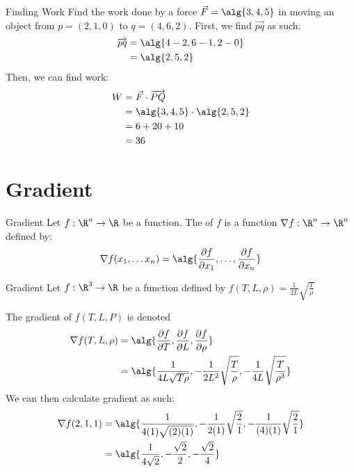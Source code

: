 \documentclass[12pt]{report}
\begin{document}
\begin{exbox}{Finding Work}{}
    Find the work done by a force $\vec{F} = \alg{3,4,5}$ in moving an object from $p = (2,1,0)$ to $q = (4,6,2)$.
    \tcblower
    First, we find $\overrightarrow{pq}$ as such:
    \begin{align*}
        \overrightarrow{pq}
        &= \alg{4-2, 6-1, 2-0} \\
        &= \alg{2,5,2}
    \end{align*}
    Then, we can find work:
    \begin{align*}
        W
        &= \vec{F} \cdot \overrightarrow{PQ} \\
        &= \alg{3,4,5} \cdot \alg{2,5,2} \\
        &= 6 + 20 + 10 \\
        &= 36
    \end{align*}
\end{exbox}

\section{Gradient}

\begin{dfnbox}{Gradient}{}
    Let $f : \R^n \to \R$ be a function. The  of $f$ is a function $\nabla f : \R^n \to \R^n$ defined by:
    \[ \nabla f(x_1, \ldots x_n) = \alg{ \frac{\partial f}{\partial x_1} , \ldots , \frac{\partial f}{\partial x_n} } \]
\end{dfnbox}

\begin{exbox}{Gradient}{}
    Let $f : \R^3 \to \R$ be a function defined by $f(T,L,\rho) = \frac{1}{2L} \sqrt{\frac{T}{\rho}}$

    The gradient of $f(T,L,P)$ is denoted
    \begin{align*}
        \nabla f(T,L,\rho)
        &= \alg{\frac{\partial f}{\partial T}, \frac{\partial f}{\partial L}, \frac{\partial f}{\partial \rho}} \\
        &= \alg{\frac{1}{4L\sqrt{T \rho}}, -\frac{1}{2L^2} \sqrt{\frac{T}{\rho}}, -\frac{1}{4L} \sqrt{\frac{T}{\rho^3}}}
    \end{align*}
    We can then calculate gradient as such:
    \begin{align*}
        \nabla f(2,1,1)
        &= \alg{ \frac{1}{4(1)\sqrt{(2)(1)}} , -\frac{1}{2(1)}\sqrt{\frac{2}{1}} , -\frac{1}{(4)(1)} \sqrt{\frac{2}{1}} } \\
        &= \alg{ \frac{1}{4\sqrt{2}} , -\frac{\sqrt{2}}{2} , - \frac{\sqrt{2}}{4} }
    \end{align*}
\end{exbox}
\end{document}
